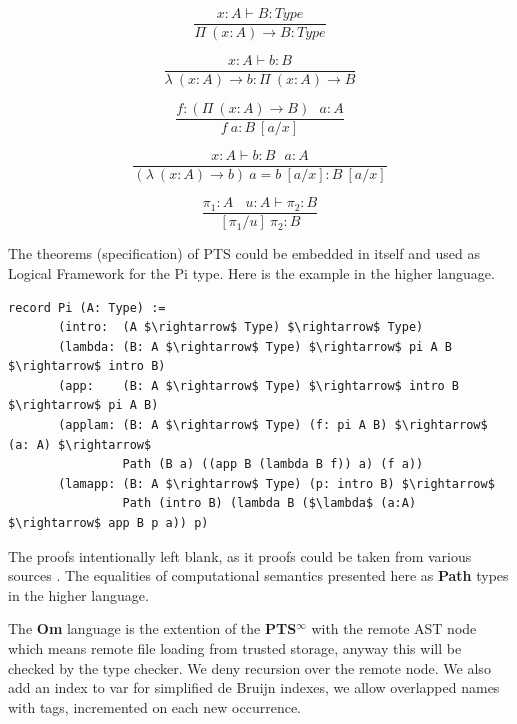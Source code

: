 \documentclass{aip-cp}
\begin{document}
\begin{equation}
\tag{$\Pi$-formation}
\dfrac
{x:A \vdash B : Type}
{\Pi\ (x:A) \rightarrow B : Type}
\end{equation}

\begin{equation}
\tag{$\lambda$-intro}
\dfrac
{x:A \vdash b : B}
{\lambda\ (x:A) \rightarrow b : \Pi\ (x: A) \rightarrow B }
\end{equation}

\begin{equation}
\tag{$App$-elimination}
\dfrac
{f: (\Pi\ (x:A) \rightarrow B)\ \ \ a: A}
{f\ a : B\ [a/x]}
\end{equation}

\begin{equation}
\tag{$\beta$-computation}
\dfrac
{x:A \vdash b: B\ \ \ a:A}
{(\lambda\ (x:A) \rightarrow b)\ a = b\ [a/x] : B\ [a/x]}
\end{equation}

\begin{equation}
\tag{subst}
\dfrac
{\pi_1 : A\ \ \ \ u:A \vdash \pi_2 : B}
{[\pi_1/u]\ \pi_2 : B}
\end{equation}

The theorems (specification) of PTS could be embedded in itself and used as
Logical Framework for the Pi type. Here is the example in the higher language.

\begin{lstlisting}[mathescape=true]
record Pi (A: Type) :=
       (intro:  (A $\rightarrow$ Type) $\rightarrow$ Type)
       (lambda: (B: A $\rightarrow$ Type) $\rightarrow$ pi A B $\rightarrow$ intro B)
       (app:    (B: A $\rightarrow$ Type) $\rightarrow$ intro B $\rightarrow$ pi A B)
       (applam: (B: A $\rightarrow$ Type) (f: pi A B) $\rightarrow$ (a: A) $\rightarrow$
                Path (B a) ((app B (lambda B f)) a) (f a))
       (lamapp: (B: A $\rightarrow$ Type) (p: intro B) $\rightarrow$
                Path (intro B) (lambda B ($\lambda$ (a:A) $\rightarrow$ app B p a)) p)
\end{lstlisting}

The proofs intentionally left blank, as it proofs could be taken from various sources \cite{Henk93}.
The equalities of computational semantics presented here as {\bf Path} types in the higher language.

The {\bf Om} language is the extention of the {\bf PTS$^\infty$} with the remote AST node which means remote file loading from trusted storage, anyway this will be checked by the type checker.
We deny recursion over the remote node.
We also add an index to var for simplified de Bruijn indexes, we allow overlapped names with tags, incremented on each new occurrence.
\end{document}
